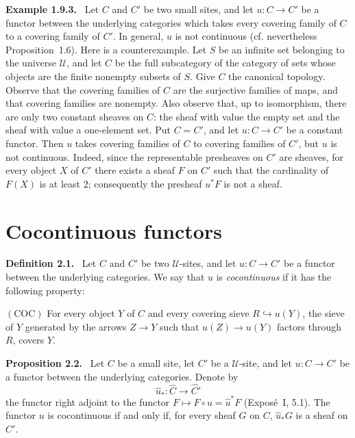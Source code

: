 \documentclass[11pt]{article}
\newcommand{\U}{\mathcal{U}}
\newenvironment{statement}[1]{\par\medskip\noindent\textbf{#1.}\ }{\par\medskip}
\newenvironment{remarktext}[1]{\par\medskip\noindent\textbf{#1.}\ }{\par\medskip}
\begin{document}
\begin{remarktext}{Example 1.9.3}
Let \(C\) and \(C'\) be two small sites, and let \(u:C\to C'\) be a functor between the underlying categories which takes every covering family of \(C\) to a covering family of \(C'\). In general, \(u\) is not continuous (cf. nevertheless Proposition~1.6). Here is a counterexample. Let \(S\) be an infinite set belonging to the universe \(\U\), and let \(C\) be the full subcategory of the category of sets whose objects are the finite nonempty subsets of \(S\). Give \(C\) the canonical topology. Observe that the covering families of \(C\) are the surjective families of maps, and that covering families are nonempty. Also observe that, up to isomorphism, there are only two constant sheaves on \(C\): the sheaf with value the empty set and the sheaf with value a one-element set. Put \(C=C'\), and let \(u:C\to C'\) be a constant functor. Then \(u\) takes covering families of \(C\) to covering families of \(C'\), but \(u\) is not continuous. Indeed, since the representable presheaves on \(C'\) are sheaves, for every object \(X\) of \(C'\) there exists a sheaf \(F\) on \(C'\) such that the cardinality of \(F(X)\) is at least \(2\); consequently the presheaf \(u^*F\) is not a sheaf.
\end{remarktext}

\bigskip
\section{Cocontinuous functors}

\begin{statement}{Definition 2.1}
Let \(C\) and \(C'\) be two \(\U\)-sites, and let \(u:C\to C'\) be a functor between the underlying categories. We say that \(u\) is \emph{cocontinuous} if it has the following property:

\medskip
\noindent\((\mathrm{COC})\) For every object \(Y\) of \(C\) and every covering sieve \(R\hookrightarrow u(Y)\), the sieve of \(Y\) generated by the arrows \(Z\to Y\) such that \(u(Z)\to u(Y)\) factors through \(R\), covers \(Y\).
\end{statement}

\begin{statement}{Proposition 2.2}
Let \(C\) be a small site, let \(C'\) be a \(\U\)-site, and let \(u:C\to C'\) be a functor between the underlying categories. Denote by
\[
\widehat u_*:\widehat C\longrightarrow\widehat {C'}
\]
the functor right adjoint to the functor \(F\mapsto F\circ u=\widehat u^*F\) (Expos\'e~I, 5.1). The functor \(u\) is cocontinuous if and only if, for every sheaf \(G\) on \(C\), \(\widehat u_*G\) is a sheaf on \(C'\).
\end{statement}
\end{document}
